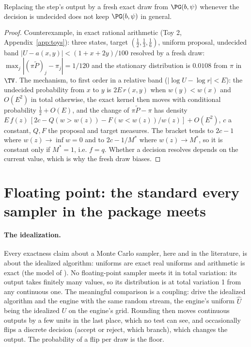 \begin{proposition}\label{prop:fresh}
Replacing the step's output by a fresh exact draw from $\PG(b,\psi)$ whenever the decision is undecided does not
keep $\PG(b,\psi)$ in general.
\end{proposition}
\begin{proof}
Counterexample, in exact rational arithmetic (Toy 2, Appendix~\ref{app:toys}): three states, target
$(\frac12,\frac13,\frac16)$, uniform proposal, undecided band $|U-a(x,y)|<(1+x+2y)/100$ resolved by a fresh draw:
$\max_j|(\pi\widetilde P)_j-\pi_j|=1/120$ and the stationary distribution is $0.0108$ from $\pi$ in $\TV$.
The mechanism, to first order in a relative band ($|\log U-\log r|<E$): the undecided probability from $x$ to $y$
is $2E\,r(x,y)$ when $w(y)<w(x)$ and $O(E^2)$ in total otherwise, the exact kernel then moves with conditional
probability $\frac12+O(E)$, and the change of $\pi\widetilde P-\pi$ has density
$E\,f(z)\,[2c-Q(w>w(z))-F(w<w(z))/w(z)]+O(E^2)$, $c$ a constant, $Q,F$ the proposal and target measures. The
bracket tends to $2c-1$ where $w(z)\to\inf w=0$ and to $2c-1/M^*$ where $w(z)\to M^*$, so it is constant only if
$M^*=1$, i.e. $f=q$. Whether a decision resolves depends on the current value, which is why the fresh draw
biases.
\end{proof}

\section{Floating point: the standard every sampler in the package meets}\label{sec:ideal}

\paragraph{The idealization.} Every exactness claim about a Monte Carlo sampler, here and in the literature, is
about the idealized algorithm: uniforms are exact real uniforms and arithmetic is exact (the model of
\cite[Ch.~I.1]{devroye}). No floating-point sampler meets it in total variation: its output takes finitely many
values, so its distribution is at total variation 1 from any continuous one. The meaningful comparison is a
coupling: drive the idealized algorithm and the engine with the same random stream, the engine's uniform
$\hat U$ being the idealized $U$ on the engine's grid. Rounding then moves continuous outputs by a few units in the
last place, which no test can see, and occasionally flips a discrete decision (accept or reject, which branch),
which changes the output. The probability of a flip per draw is the floor.

